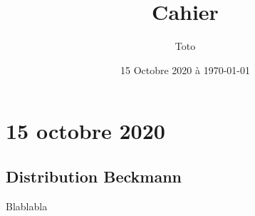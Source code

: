 \documentclass[a4paper]{article}
\begin{document}
\newcommand{\HRule}{\rule{\linewidth}{0.5mm}}

%


\title{Cahier}
\author{Toto}
\date{15 Octobre 2020 à \today}
\maketitle



\renewcommand{\arraystretch}{1.5}



\tableofcontents

\section{15 octobre 2020}

\subsection{Distribution Beckmann}

Blablabla



\end{document}
